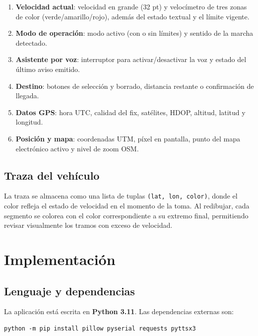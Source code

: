 \documentclass[10pt]{article}
\begin{document}
\begin{enumerate}[leftmargin=1.6em]
    \item \textbf{Velocidad actual}: velocidad en grande (32 pt) y velocímetro de tres zonas de color (verde/amarillo/rojo), además del estado textual y el límite vigente.
    \item \textbf{Modo de operación}: modo activo (con o sin límites) y sentido de la marcha detectado.
    \item \textbf{Asistente por voz}: interruptor para activar/desactivar la voz y estado del último aviso emitido.
    \item \textbf{Destino}: botones de selección y borrado, distancia restante o confirmación de llegada.
    \item \textbf{Datos GPS}: hora UTC, calidad del fix, satélites, HDOP, altitud, latitud y longitud.
    \item \textbf{Posición y mapa}: coordenadas UTM, píxel en pantalla, punto del mapa electrónico activo y nivel de zoom OSM.
\end{enumerate}

\subsection{Traza del vehículo}

La traza se almacena como una lista de tuplas \texttt{(lat, lon, color)}, donde el color refleja el estado de velocidad en el momento de la toma. Al redibujar, cada segmento se colorea con el color correspondiente a su extremo final, permitiendo revisar visualmente los tramos con exceso de velocidad.

\section{Implementación}

\subsection{Lenguaje y dependencias}

La aplicación está escrita en \textbf{Python 3.11}. Las dependencias externas son:

\begin{lstlisting}[style=pythonEstilo]
python -m pip install pillow pyserial requests pyttsx3
\end{lstlisting}
\end{document}
